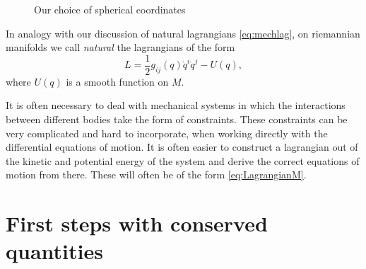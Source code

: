 \documentclass[english,fontsize=11pt,paper=a5,oneside]{scrbook}
\theoremstyle{definition}
\newenvironment{remark}
  {\pushQED{\qed}\renewcommand{\qedsymbol}{$\lozenge$}\remarkx}
  {\popQED\endremarkx}
\begin{document}
\begin{figure}[ht]
    \centering
    \label{fig:sphcoords}
    \caption{Our choice of spherical coordinates}
\end{figure}

In analogy with our discussion of natural lagrangians \eqref{eq:mechlag}, on riemannian manifolds we call \emph{natural} the lagrangians of the form
\begin{equation}\label{eq:LagrangianM}
    L = \frac 12 g_{ij}(q)\dot q^i \dot q^j - U(q),
\end{equation}
where $U(q)$ is a smooth function on $M$.

\begin{remark}
    It  is  often  necessary  to  deal  with  mechanical  systems  in  which the interactions between different bodies take the form of constraints.
    These constraints can  be  very  complicated  and  hard  to  incorporate,  when  working directly  with  the differential  equations  of  motion.
    It  is  often  easier  to  construct  a  lagrangian out of the kinetic and potential energy of the system and derive the correct equations of motion from there.
    These will often be of the form \eqref{eq:LagrangianM}.
\end{remark}

\section{First steps with conserved quantities}
\end{document}
